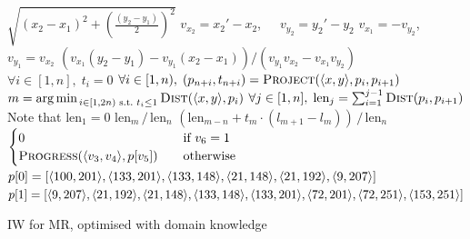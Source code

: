\begin{algorithm}[hbtp]
\begin{algorithmic}
\State \Return $\sqrt{(x_2-x_1)^2 + \left( \frac{(y_2-y_1)}{2}\right)^2}$
\EndFunction
{}
\State $v_{x_2} = x_2' - x_2$,~~~$v_{y_2} = y_2' - y_2$
\State $v_{x_1} = -v_{y_2}$,~~~$v_{y_1} = v_{x_2}$
\State \Return $\left( v_{x_1}(y_2-y_1) - v_{y_1}(x_2-x_1) \right) /
\left( v_{y_1}v_{x_2} - v_{x_1}v_{y_2} \right)$
\EndFunction
{}
  \State $\forall i \in [1, n], \; t_i = 0$
  \State $\forall i \in [1, n), \; (p_{n+i}, t_{n+i}) =
    \Call{Project}{\pointt{x, y},p_i, p_{i+1}}$
  \State $m = \argmin_{\,i \in [1, 2n) \text{~s.t.~} t_i \leq 1} \Call{Dist}{\pointt{x, y}, p_i}$
    \State {}
  \EndIf
  \State $\forall j \in [1, n], \; \text{len}_j = \sum_{i=1}^{j-1} \Call{Dist}{p_i, p_{i+1}}$
  \Comment Note that $\text{len}_1 = 0$
    \State \Return $\text{len}_m \,/\, \text{len}_n$
  \Else
    \State \Return $(\text{len}_{m-n} + t_m\cdot (l_{m+1} - l_m)) \, / \, \text{len}_n$
  \EndIf
\EndFunction
{}
\State \Return $\begin{cases}
  0 &\quad\text{if }v_6=1 \\
  \Call{Progress}{\pointt{v_3,v_4}, p[v_5]} &\quad\text{otherwise}
  \end{cases}$
\EndFunction
\State $p[0] = [\langle 100, 201 \rangle, \langle 133, 201 \rangle, \langle 133, 148 \rangle,
\langle 21, 148 \rangle, \langle 21, 192 \rangle, \langle 9, 207 \rangle]$
\State $p[1] = [\langle 9, 207 \rangle, \langle 21, 192 \rangle, \langle 21, 148 \rangle, \langle 133,
148 \rangle, \langle 133, 201 \rangle, \langle 72, 201 \rangle, \langle 72, 251 \rangle, \langle 153, 251 \rangle]$
\end{algorithmic}
\caption{\ac{IW} for \acl{MR}, optimised with domain knowledge}
\label{alg:iw-optimised}
\end{algorithm}



